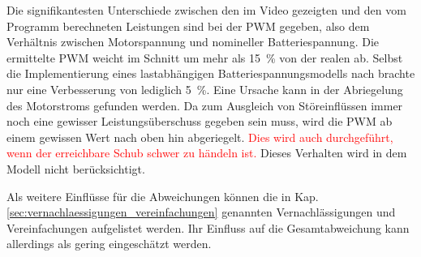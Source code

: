 Die signifikantesten Unterschiede zwischen den im Video gezeigten und den vom Programm berechneten Leistungen sind bei der PWM gegeben, also dem Verhältnis zwischen Motorspannung und nomineller Batteriespannung. Die ermittelte PWM weicht im Schnitt um mehr als \SI{15}{\%} von der realen ab. Selbst die Implementierung eines lastabhängigen Batteriespannungsmodells nach \cite{Tremblay.2009} brachte nur eine Verbesserung von lediglich \SI{5}{\%}. Eine Ursache kann in der Abriegelung des Motorstroms gefunden werden. Da zum Ausgleich von Störeinflüssen immer noch eine gewisser Leistungsüberschuss gegeben sein muss, wird die PWM ab einem gewissen Wert nach oben hin abgeriegelt. \textcolor{red}{Dies wird auch durchgeführt, wenn der erreichbare Schub schwer zu händeln ist.} Dieses Verhalten wird in dem Modell nicht berücksichtigt. 

Als weitere Einflüsse für die Abweichungen können die in Kap. \ref{sec:vernachlaessigungen_vereinfachungen} genannten Vernachlässigungen und Vereinfachungen aufgelistet werden. Ihr Einfluss auf die Gesamtabweichung kann allerdings als gering eingeschätzt werden.
